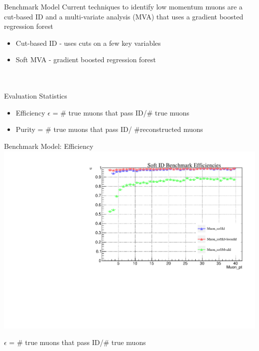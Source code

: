 \documentclass[10pt,handout]{beamer}
\begin{document}
\begin{frame}{Benchmark Model}
Current techniques to identify low momentum muons are a cut-based ID and a multi-variate analysis (MVA) that uses a gradient boosted regression forest
\quad \\
\begin{itemize}
\item Cut-based ID - uses cuts on a few key variables
\item Soft MVA - gradient boosted regression forest
\end{itemize}
\quad \\
\quad \\
Evaluation Statistics
\begin{itemize}
\item Efficiency $\epsilon$ = \# true muons that pass ID/\# true muons
\item Purity = \# true muons that pass ID/ \#reconstructed muons
\end{itemize}
\end{frame}




\begin{frame}{Benchmark Model: Efficiency}
\centering
\includegraphics[scale=.5]{benchmarkEfficiency_TTjets.pdf}

$\epsilon$ = \# true muons that pass ID/\# true muons
\end{frame}
\end{document}
